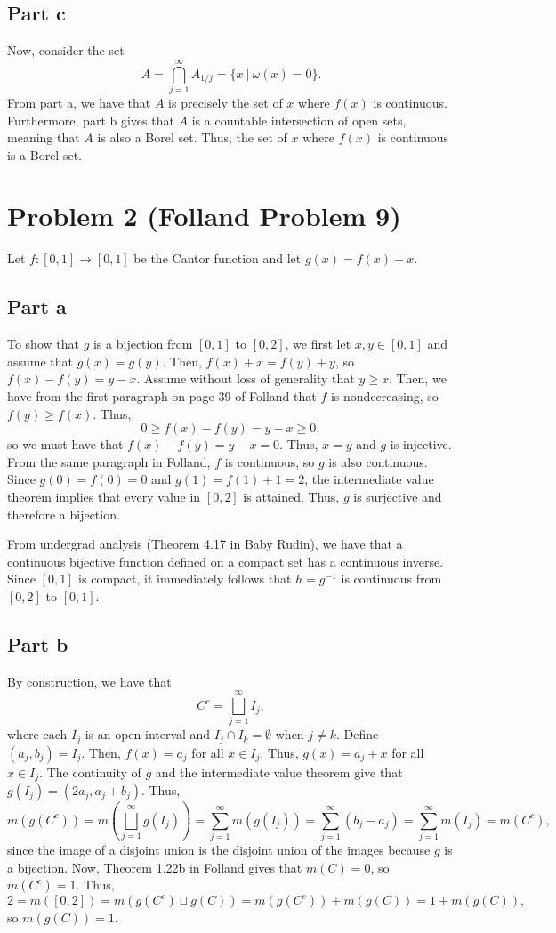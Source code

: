 \documentclass{article}
\begin{document}
\subsection{Part c}
Now, consider the set
\[
A=\bigcap_{j=1}^\infty A_{1/j}=\{x~|~\omega(x)=0\}.
\]
From part a, we have that $A$ is precisely the set of $x$ where $f(x)$ is continuous. Furthermore, part b gives that $A$ is a countable intersection of open sets, meaning that $A$ is also a Borel set. Thus, the set of $x$ where $f(x)$ is continuous is a Borel set.

\section{Problem 2 (Folland Problem 9)}
Let $f:[0,1]\to[0,1]$ be the Cantor function and let $g(x)=f(x)+x$. 

\subsection{Part a}
To show that $g$ is a bijection from $[0,1]$ to $[0,2]$, we first let $x,y\in[0,1]$ and assume that $g(x)=g(y)$. Then, $f(x)+x=f(y)+y$, so $f(x)-f(y)=y-x$. Assume without loss of generality that $y\geq x$. Then, we have from the first paragraph on page 39 of Folland that $f$ is nondecreasing, so $f(y)\geq f(x)$. Thus, 
\[
0\geq f(x)-f(y)=y-x\geq 0,
\]
so we must have that $f(x)-f(y)=y-x=0$. Thus, $x=y$ and $g$ is injective. From the same paragraph in Folland, $f$ is continuous, so $g$ is also continuous. Since $g(0)=f(0)=0$ and $g(1)=f(1)+1=2$, the intermediate value theorem implies that every value in $[0,2]$ is attained. Thus, $g$ is surjective and therefore a bijection. 

From undergrad analysis (Theorem 4.17 in Baby Rudin), we have that a continuous bijective function defined on a compact set has a continuous inverse. Since $[0,1]$ is compact, it immediately follows that $h=g^{-1}$ is continuous from $[0,2]$ to $[0,1]$.

\subsection{Part b}
By construction, we have that
\[
C^c=\bigsqcup_{j=1}^\infty I_j,
\]
where each $I_j$ is an open interval and $I_j\cap I_k=\emptyset$ when $j\neq k$. Define $(a_j,b_j)=I_j$. Then, $f(x)=a_j$ for all $x\in I_j$. Thus, $g(x)=a_j+x$ for all $x\in I_j$. The continuity of $g$ and the intermediate value theorem give that $g(I_j)=(2a_j,a_j+b_j)$. Thus,
\[
m(g(C^c))=m\left(\bigsqcup_{j=1}^\infty g(I_j)\right)=\sum_{j=1}^{\infty}m(g(I_j))=\sum_{j=1}^{\infty}(b_j-a_j)=\sum_{j=1}^{\infty}m(I_j)=m(C^c),
\]
since the image of a disjoint union is the disjoint union of the images because $g$ is a bijection. Now, Theorem 1.22b in Folland gives that $m(C)=0$, so $m(C^c)=1$. Thus,
\[
2=m([0,2])=m\left(g(C^c)\sqcup g(C)\right)=m\left(g(C^c)\right)+m\left(g(C)\right)=1+m\left(g(C)\right),
\]
so $m\left(g(C)\right)=1$.
\end{document}

